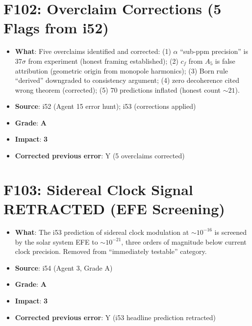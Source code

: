 \documentclass[11pt,a4paper]{article}
\newcommand{\grade}[1]{\textbf{#1}}
\newcommand{\impact}[1]{\textbf{#1}}
\begin{document}
\section{F102: Overclaim Corrections (5 Flags from i52)}
\begin{itemize}[nosep]
\item \textbf{What}: Five overclaims identified and corrected: (1) $\alpha$ ``sub-ppm precision'' is $37\sigma$ from experiment (honest framing established); (2) $c_f$ from $A_5$ is false attribution (geometric origin from monopole harmonics); (3) Born rule ``derived'' downgraded to consistency argument; (4) zero decoherence cited wrong theorem (corrected); (5) 70 predictions inflated (honest count $\sim 21$).
\item \textbf{Source}: i52 (Agent 15 error hunt); i53 (corrections applied)
\item \textbf{Grade}: \grade{A}
\item \textbf{Impact}: \impact{3}
\item \textbf{Corrected previous error}: Y (5 overclaims corrected)
\end{itemize}

\section{F103: Sidereal Clock Signal RETRACTED (EFE Screening)}
\begin{itemize}[nosep]
\item \textbf{What}: The i53 prediction of sidereal clock modulation at $\sim 10^{-16}$ is screened by the solar system EFE to $\sim 10^{-21}$, three orders of magnitude below current clock precision. Removed from ``immediately testable'' category.
\item \textbf{Source}: i54 (Agent 3, Grade A)
\item \textbf{Grade}: \grade{A}
\item \textbf{Impact}: \impact{3}
\item \textbf{Corrected previous error}: Y (i53 headline prediction retracted)
\end{itemize}

\end{document}

